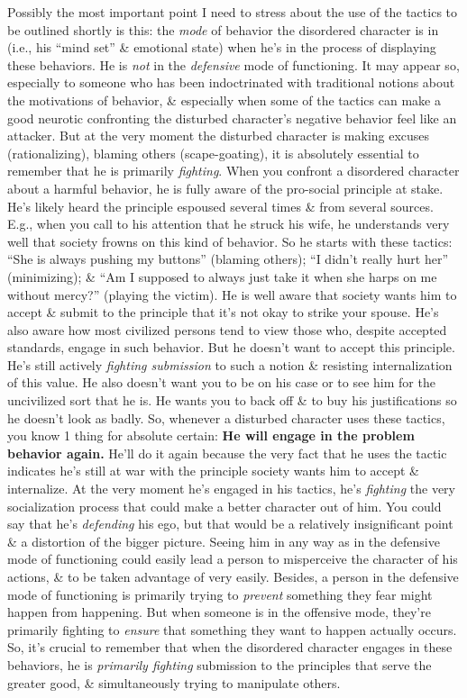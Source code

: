 \documentclass{article}
\numberwithin{equation}{section}
\begin{document}
Possibly the most important point I need to stress about the use of the tactics to be outlined shortly is this: the \textit{mode} of behavior the disordered character is in (i.e., his ``mind set'' \& emotional state) when he's in the process of displaying these behaviors. He is \textit{not} in the \textit{defensive} mode of functioning. It may appear so, especially to someone who has been indoctrinated with traditional notions about the motivations of behavior, \& especially when some of the tactics can make a good neurotic confronting the disturbed character's negative behavior feel like an attacker. But at the very moment the disturbed character is making excuses (rationalizing), blaming others (scape-goating), it is absolutely essential to remember that he is primarily \textit{fighting}. When you confront a disordered character about a harmful behavior, he is fully aware of the pro-social principle at stake. He's likely heard the principle espoused several times \& from several sources. E.g., when you call to his attention that he struck his wife, he understands very well that society frowns on this kind of behavior. So he starts with these tactics: ``She is always pushing my buttons'' (blaming others); ``I didn't really hurt her'' (minimizing); \& ``Am I supposed to always just take it when she harps on me without mercy?'' (playing the victim). He is well aware that society wants him to accept 
\& submit to the principle that it's not okay to strike your spouse. He's also aware how most civilized persons tend to view those who, despite accepted standards, engage in such behavior. But he doesn't want to accept this principle. He's still actively \textit{fighting submission} to such a notion \& resisting internalization of this value. He also doesn't want you to be on his case or to see him for the uncivilized sort that he is. He wants you to back off \& to buy his justifications so he doesn't look as badly. So, whenever a disturbed character uses these tactics, you know 1 thing for absolute certain: \textbf{He will engage in the problem behavior again.} He'll do it again because the very fact that he uses the tactic indicates he's still at war with the principle society wants him to accept \& internalize. At the very moment he's engaged in his tactics, he's \textit{fighting} the very socialization process that could make a better character out of him. You could say that he's \textit{defending} his ego, but that would be a relatively insignificant point \& a distortion of the bigger picture. Seeing him in any way as in the defensive mode of functioning could easily lead a person to misperceive the character of his actions, \& to be taken advantage of very easily. Besides, a person in the defensive mode of functioning is primarily trying to \textit{prevent} something they fear might happen from happening. But when someone is in the offensive mode, they're primarily fighting to \textit{ensure} that something they want to happen actually occurs. So, it's crucial to remember that when the disordered character engages in these behaviors, he is \textit{primarily fighting} submission to the principles that serve the greater good, \& simultaneously trying to manipulate others.
\end{document}
